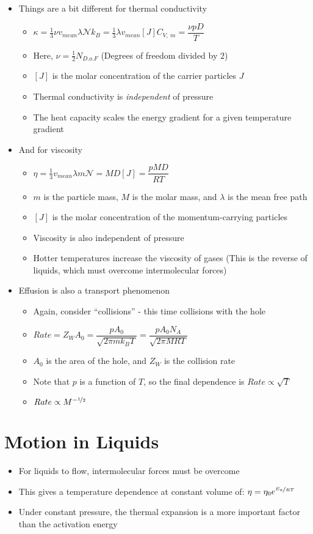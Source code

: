 \documentclass[12pt, openany, letterpaper]{memoir}
\begin{document}
\begin{itemize}
\begin{itemize}
	\end{itemize}
	\item Things are a bit different for thermal conductivity
	\begin{itemize}
		\item $\kappa = \frac{1}{3}\nu v_{mean}\lambda\mathcal{N}k_B = \frac{1}{3}\lambda v_{mean}[J]C_{V,~m} = \dfrac{\nu pD}{T}$
		\item Here, $\nu = \frac{1}{2}N_{D.o.F}$ (Degrees of freedom divided by 2)
		\item $[J]$ is the molar concentration of the carrier particles $J$
		\item Thermal conductivity is \emph{independent} of pressure
		\item The heat capacity scales the energy gradient for a given temperature gradient
	\end{itemize}
	\item And for viscosity
	\begin{itemize}
		\item $\eta = \frac{1}{3}v_{mean}\lambda m\mathcal{N} = MD[J] = \dfrac{pMD}{RT}$
		\item $m$ is the particle mass, $M$ is the molar mass, and $\lambda$ is the mean free path
		\item $[J]$ is the molar concentration of the momentum-carrying particles
		\item Viscosity is also independent of pressure
		\item Hotter temperatures increase the viscosity of gases (This is the reverse of liquids, which must overcome intermolecular forces)
	\end{itemize}
	\item Effusion is also a transport phenomenon
	\begin{itemize}
		\item Again, consider “collisions” - this time collisions with the hole
		\item $Rate = Z_WA_0=\dfrac{pA_0}{\sqrt{2\pi m k_BT}}=\dfrac{pA_0N_A}{\sqrt{2\pi MRT}}$
		\item $A_0$ is the area of the hole, and $Z_W$ is the collision rate
		\item Note that $p$ is a function of $T$, so the final dependence is $Rate\propto\sqrt{T}$
		\item $Rate\propto M^{-\nicefrac{1}{2}}$
	\end{itemize}
\end{itemize}

\section{Motion in Liquids}
\begin{itemize}
	\item For liquids to flow, intermolecular forces must be overcome
	\item This gives a temperature dependence at constant volume of: $\eta=\eta_0e^{\nicefrac{E_a}{RT}}$
	\item Under constant pressure, the thermal expansion is a more important factor than the activation energy
\end{itemize}
\end{document}
